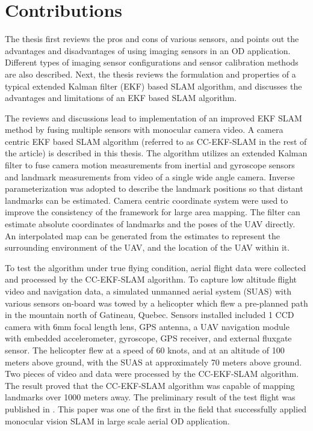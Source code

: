 \section{Contributions}\label{section:Contribution}
The thesis first reviews the pros and cons of various sensors, and
points out the advantages and disadvantages of using imaging sensors in
an OD application. Different types of imaging sensor configurations and
sensor calibration methods are also described. Next, the thesis
reviews the formulation and properties of a typical extended Kalman
filter (EKF) based SLAM algorithm, and discusses the advantages and
limitations of an EKF based SLAM algorithm.

The reviews and discussions lead to implementation of an improved EKF
SLAM method by fusing multiple sensors with monocular camera video.
A camera centric EKF based SLAM algorithm (referred to as CC-EKF-SLAM
in the rest of the article) is described in this thesis. The
algorithm utilizes an extended Kalman filter to fuse camera motion
measurements from inertial and gyroscope sensors and landmark
measurements from video of a single wide angle camera. Inverse
parameterization was adopted to describe the landmark positions so
that distant landmarks can be estimated. Camera centric coordinate system
were used to improve the consistency of the framework for large area
mapping. The filter can estimate absolute coordinates of landmarks and
the poses of the UAV directly. An interpolated map can be generated
from the estimates to represent the surrounding environment of the
UAV, and the location of the UAV within it.

To test the algorithm under true flying condition, aerial flight data
were collected and processed by the CC-EKF-SLAM algorithm. To capture
low altitude flight video and navigation data, a simulated unmanned
aerial system (SUAS) with various sensors on-board was towed by a
helicopter which flew a pre-planned path in the mountain north of
Gatineau, Quebec. Sensors installed included 1 CCD camera with 6mm
focal length lens, GPS antenna, a UAV navigation module with embedded
accelerometer, gyroscope, GPS receiver, and external fluxgate sensor.
The helicopter flew at a speed of 60 knots, and at an altitude of 100
meters above ground, with the SUAS at approximately 70 meters above
ground. Two pieces of video and data were processed by the CC-EKF-SLAM
algorithm. The result proved that the CC-EKF-SLAM algorithm was
capable of mapping landmarks over 1000 meters away. The preliminary
result of the test flight was published in \cite{zhang_obstacle_2012}.
This paper was one of the first in the field that successfully applied
monocular vision SLAM in large scale aerial OD application.

